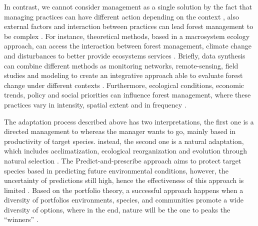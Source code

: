 In contrast, we cannot consider management as a single solution by the fact that managing practices can have different action depending on the context \parencite{Millar2007}, also external factors and interaction between practices can lead forest management to be complex \parencite{Becknell2015}.
For instance, theoretical methods, based in a macrosystem ecology approach, can access the interaction between forest management, climate change and disturbances to better provide ecosystems services \parencite{Heffernan2014,Becknell2015}.
Briefly, data synthesis can combine different methods as monitoring networks, remote-sensing, field studies and modeling to create an integrative approach able to evaluate forest change under different contexts \parencite{Becknell2015}.
Furthermore, ecological conditions, economic trends, policy and social priorities can influence forest management, where these practices vary in intensity, spatial extent and in frequency \parencite{Becknell2015}.

The adaptation process described above has two interpretations, the first one is a directed management to whereas the manager wants to go, mainly based in productivity of target species.  instead, the second one is a natural adaptation, which includes acclimatization, ecological reorganization and evolution through natural selection \parencite{Webster2017}.
The Predict-and-prescribe approach aims to protect target species based in predicting future environmental conditions, however, the uncertainty of predictions still high, hence the effectiveness of this approach is limited \parencite{Schindler2015}.
Based on the portfolio theory, a successful approach happens when a diversity of portfolios environments, species, and communities promote a wide diversity of options, where in the end, nature will be the one to peaks the ``winners'' \parencite{Webster2017}.

%



